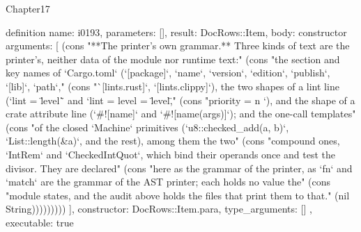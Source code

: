 \begin{lexlean}{Chapter17}
\begin{semanticmodule}
definition{
  name: i0193,
  parameters: [],
  result: DocRows::Item,
  body: constructor{
    arguments: [
      (cons "**The printer's own grammar.** Three kinds of text are the printer's, neither data of the module nor runtime text:" (cons "the section and key names of `Cargo.toml` (`[package]`, `name`, `version`, `edition`, `publish`, `[lib]`, `path`," (cons "`[lints.rust]`, `[lints.clippy]`), the two shapes of a lint line (`lint = \"level\"` and `lint = { level = \"level\"," (cons "priority = n }`), and the shape of a crate attribute line (`#![name]` and `#![name(args)]`); and the one-call templates" (cons "of the closed `Machine` primitives (`u8::checked_add(a, b)`, `List::length(&a)`, and the rest), among them the two" (cons "compound ones, `IntRem` and `CheckedIntQuot`, which bind their operands once and test the divisor. They are declared" (cons "here as the grammar of the printer, as `fn` and `match` are the grammar of the AST printer; each holds no value the" (cons "module states, and the audit above holds the files that print them to that." (nil String)))))))))
    ],
    constructor: DocRows::Item.para,
    type_arguments: []
  },
  executable: true
}


\end{semanticmodule}
\end{lexlean}
